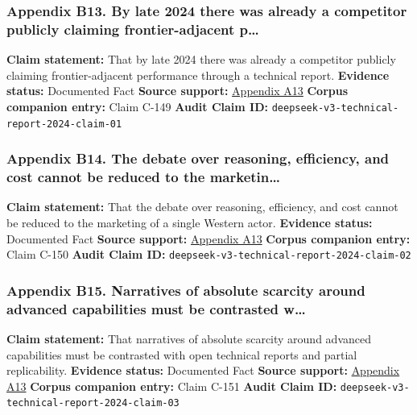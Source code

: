 \documentclass[
  american,
  11pt,
  letterpaper,
]{article}
\begin{document}
\subsubsection{Appendix B13. By late 2024 there was already a competitor
publicly claiming frontier-adjacent
p\ldots{}}\label{appendix-b13-by-late-2024-there-was-already-a-competitor-publicly-claiming-frontier-adjacent-p}

\textbf{Claim statement:} That by late 2024 there was already a
competitor publicly claiming frontier-adjacent performance through a
technical report. \textbf{Evidence status:} Documented Fact
\textbf{Source support:}
\hyperref[appendix-a13-deepseek-v3-technical-report]{Appendix A13}
\textbf{Corpus companion entry:} Claim C-149 \textbf{Audit Claim ID:}
\texttt{deepseek-v3-technical-report-2024-claim-01}

\subsubsection{Appendix B14. The debate over reasoning, efficiency, and
cost cannot be reduced to the
marketin\ldots{}}\label{appendix-b14-the-debate-over-reasoning-efficiency-and-cost-cannot-be-reduced-to-the-marketin}

\textbf{Claim statement:} That the debate over reasoning, efficiency,
and cost cannot be reduced to the marketing of a single Western actor.
\textbf{Evidence status:} Documented Fact \textbf{Source support:}
\hyperref[appendix-a13-deepseek-v3-technical-report]{Appendix A13}
\textbf{Corpus companion entry:} Claim C-150 \textbf{Audit Claim ID:}
\texttt{deepseek-v3-technical-report-2024-claim-02}

\subsubsection{Appendix B15. Narratives of absolute scarcity around
advanced capabilities must be contrasted
w\ldots{}}\label{appendix-b15-narratives-of-absolute-scarcity-around-advanced-capabilities-must-be-contrasted-w}

\textbf{Claim statement:} That narratives of absolute scarcity around
advanced capabilities must be contrasted with open technical reports and
partial replicability. \textbf{Evidence status:} Documented Fact
\textbf{Source support:}
\hyperref[appendix-a13-deepseek-v3-technical-report]{Appendix A13}
\textbf{Corpus companion entry:} Claim C-151 \textbf{Audit Claim ID:}
\texttt{deepseek-v3-technical-report-2024-claim-03}
\end{document}
